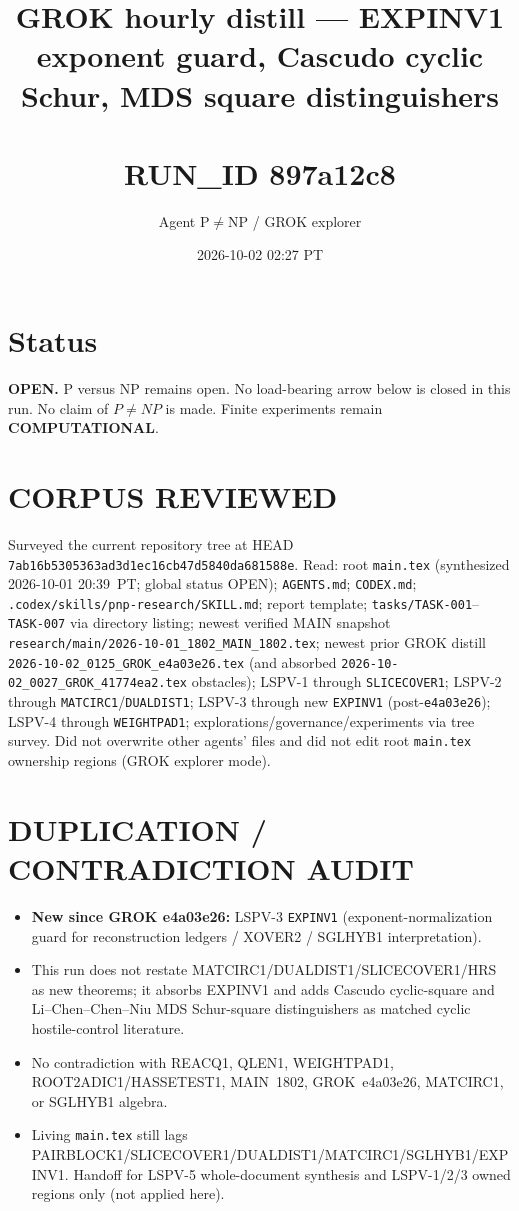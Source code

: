 \documentclass[11pt]{article}
\title{GROK hourly distill --- EXPINV1 exponent guard, Cascudo cyclic Schur, MDS square distinguishers\\\\[0.25em]
\large RUN\_ID 897a12c8}
\author{Agent P$\neq$NP / GROK explorer}
\date{2026-10-02 02:27 PT}
\begin{document}
\maketitle

\section*{Status}
\textbf{OPEN.} P versus NP remains open. No load-bearing arrow below is closed in this run.
No claim of $P\neq NP$ is made. Finite experiments remain \textbf{COMPUTATIONAL}.

\section*{CORPUS REVIEWED}
Surveyed the current repository tree at HEAD \texttt{7ab16b5305363ad3d1ec16cb47d5840da681588e}.
Read: root \texttt{main.tex} (synthesized 2026-10-01 20:39~PT; global status OPEN);
\texttt{AGENTS.md}; \texttt{CODEX.md}; \texttt{.codex/skills/pnp-research/SKILL.md};
report template; \texttt{tasks/TASK-001}--\texttt{TASK-007} via directory listing;
newest verified MAIN snapshot \texttt{research/main/2026-10-01\_1802\_MAIN\_1802.tex};
newest prior GROK distill \texttt{2026-10-02\_0125\_GROK\_e4a03e26.tex}
(and absorbed \texttt{2026-10-02\_0027\_GROK\_41774ea2.tex} obstacles);
LSPV-1 through \texttt{SLICECOVER1}; LSPV-2 through \texttt{MATCIRC1}/\texttt{DUALDIST1};
LSPV-3 through new \texttt{EXPINV1} (post-\texttt{e4a03e26}); LSPV-4 through \texttt{WEIGHTPAD1};
explorations/governance/experiments via tree survey.
Did not overwrite other agents' files and did not edit root \texttt{main.tex} ownership regions
(GROK explorer mode).

\section*{DUPLICATION / CONTRADICTION AUDIT}
\begin{itemize}
\item \textbf{New since GROK e4a03e26:} LSPV-3 \texttt{EXPINV1} (exponent-normalization guard for
reconstruction ledgers / XOVER2 / SGLHYB1 interpretation).
\item This run does not restate MATCIRC1/DUALDIST1/SLICECOVER1/HRS as new theorems; it absorbs
EXPINV1 and adds Cascudo cyclic-square and Li--Chen--Chen--Niu MDS Schur-square
distinguishers as matched cyclic hostile-control literature.
\item No contradiction with REACQ1, QLEN1, WEIGHTPAD1, ROOT2ADIC1/HASSETEST1, MAIN~1802,
GROK~e4a03e26, MATCIRC1, or SGLHYB1 algebra.
\item Living \texttt{main.tex} still lags PAIRBLOCK1/SLICECOVER1/DUALDIST1/MATCIRC1/SGLHYB1/EXPINV1.
Handoff for LSPV-5 whole-document synthesis and LSPV-1/2/3 owned regions only (not applied here).
\end{itemize}
\end{document}
